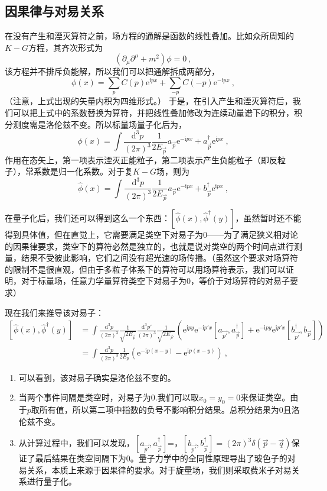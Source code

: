 \subsection{因果律与对易关系}
在没有产生和湮灭算符之前，场方程的通解是函数的线性叠加。比如众所周知的$K-G$方程，其齐次形式为
$$(\partial_\mu\partial^\mu+m^2)\phi=0~,$$
该方程并不排斥负能解，所以我们可以把通解拆成两部分，
$$\phi(x)=\sum_pC(p)\mathrm e ^{\mathrm {i} px}+\sum_{-p}C(-p)\mathrm e ^{-\mathrm {i} px}~,$$
（注意，上式出现的矢量内积为四维形式。）
于是，在引入产生和湮灭算符后，我们可以把上式中的系数替换为算符，并把线性叠加修改为连续动量谱下的积分，积分测度需是洛伦兹不变。所以标量场量子化后为，
\begin{equation}
\phi (x)=\int\frac{\mathrm d^3 p}{(2\pi )^3}\frac {1}{2E_{\vec p}} a_\vec p\mathrm e^{-\mathrm ipx}+a_\vec p^\dagger\mathrm e^{\mathrm ipx}~,
\end{equation}
作用在态矢上，第一项表示湮灭正能粒子，第二项表示产生负能粒子（即反粒子），常系数是归一化系数。对于复$K-G$场，则为
\begin{equation}
\hat \phi (x)=\int\frac{\mathrm d^3 p}{(2\pi )^3}\frac {1}{2E_{\vec p}} a_\vec p\mathrm e^{-\mathrm ipx}+b_\vec p^\dagger\mathrm e^{\mathrm ipx}~,
\end{equation}




在量子化后，我们还可以得到这么一个东西：$[\hat{\phi}(x),\hat{\phi}^\dagger(y)]$，虽然暂时还不能得到具体值，但在直觉上，它需要满足类空下对易子为0——为了满足狭义相对论的因果律要求，类空下的算符必然是独立的，也就是说对类空的两个时间点进行测量，结果不受彼此影响，它们之间没有超光速的场传播。（虽然这个要求对场算符的限制不是很直观，但由于多粒子体系下的算符可以用场算符表示，我们可以证明，对于标量场，任意力学量算符类空下对易子为0，等价于对场算符的对易子要求）

现在我们来推导该对易子：
\begin{equation}
\begin{aligned}
[\hat{\phi}(x),\hat{\phi}^\dagger(y)]&=\int\frac{\mathrm d^3p}{(2\pi )^3}\frac {1}{\sqrt{2 E_{\vec p}}}\frac{\mathrm d^3p'}{(2\pi )^3}\frac {1}{\sqrt{2 E_{\vec p'}}}(\mathrm {e}^{\mathrm {i}py}\mathrm {e}^{-\mathrm {i}p'x}[a_{\vec {p'}},a^\dagger_{\vec p}]+ \mathrm e^{-\mathrm i py}\mathrm e^{\mathrm i p'x}[b^\dagger_{\vec {p'}},b_{{\vec p}}])\\
&=\int \frac {\mathrm d^3 p}{(2 \pi)^3}\frac {1}{2 E_p}(\mathrm e^{-\mathrm i p(x-y)}-\mathrm e^{\mathrm i p(x-y)})~,
\end{aligned}
\end{equation}
\begin{enumerate}
\item 可以看到，该对易子确实是洛伦兹不变的。
\item 当两个事件间隔是类空时，对易子为0.我们可以取$x_0=y_0=0$来保证类空。由于$p$取所有值，所以第二项中指数的负号不影响积分结果。总积分结果为0且洛伦兹不变。
\item 从计算过程中，我们可以发现，$[a_{\vec {p'}},a^\dagger_{\vec p}]$=，$[b_{\vec {p'}},b^\dagger_{\vec p}]=(2\pi)^3\delta(\vec p-\vec q)$保证了最后结果在类空间隔下为$0$。量子力学中的全同性原理导出了玻色子的对易关系，本质上来源于因果律的要求。对于旋量场，我们则采取费米子对易关系进行量子化。
\end{enumerate}

